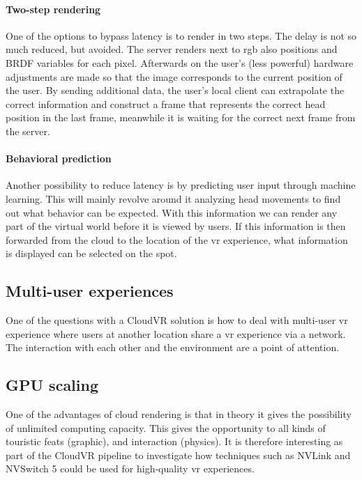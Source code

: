 \paragraph{Two-step rendering}
One of the options to bypass latency is to render in two steps.
The delay is not so much reduced, but avoided. The server renders next to
\acrshort{rgb} also positions and BRDF variables for each pixel. Afterwards on the
user's (less powerful) hardware adjustments are made so that the image corresponds to the current position of the user.
By sending additional data, the user's local client can extrapolate the correct information and construct a frame that represents the correct head position in the last frame, meanwhile it is waiting for the  correct next frame from the server.
\paragraph{Behavioral prediction}
Another possibility to reduce latency is by predicting
user input through machine learning. This will mainly revolve around it
analyzing head movements to find out what behavior can be expected. With
this information we can render any part of the virtual world before it
is viewed by users. If this information is then forwarded from the
cloud to the location of the \acrshort{vr} experience, what information is displayed can be selected on the spot.

\subsection{Multi-user experiences}
One of the questions with a CloudVR solution is how to deal with multi-user \acrshort{vr} experience where
users at another location share a \acrshort{vr} experience via a network. The interaction with
each other and the environment are a point of attention.

\subsection{GPU scaling}
One of the advantages of cloud rendering is that in theory it gives the possibility of unlimited
computing capacity. This gives the opportunity to all kinds of touristic feats
(graphic), and interaction (physics). It is therefore interesting as part of the CloudVR pipeline
to investigate how techniques such as NVLink and NVSwitch 5 \parencite{nvlink} could be used for
high-quality \acrshort{vr} experiences.